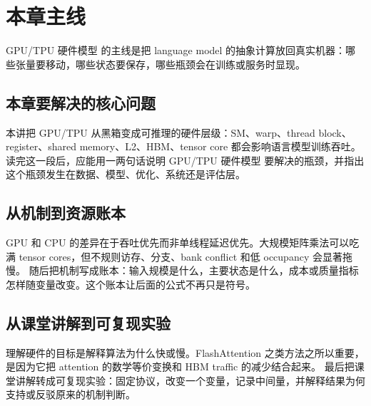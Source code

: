 \documentclass[a4paper]{article}
\begin{document}
\section{本章主线}
GPU/TPU 硬件模型 的主线是把 language model 的抽象计算放回真实机器：哪些张量要移动，哪些状态要保存，哪些瓶颈会在训练或服务时显现。
\subsection{本章要解决的核心问题}
本讲把 GPU/TPU 从黑箱变成可推理的硬件层级：SM、warp、thread block、register、shared memory、L2、HBM、tensor core 都会影响语言模型训练吞吐。
读完这一段后，应能用一两句话说明 GPU/TPU 硬件模型 要解决的瓶颈，并指出这个瓶颈发生在数据、模型、优化、系统还是评估层。
\subsection{从机制到资源账本}
GPU 和 CPU 的差异在于吞吐优先而非单线程延迟优先。大规模矩阵乘法可以吃满 tensor cores，但不规则访存、分支、bank conflict 和低 occupancy 会显著拖慢。
随后把机制写成账本：输入规模是什么，主要状态是什么，成本或质量指标怎样随变量改变。这个账本让后面的公式不再只是符号。
\subsection{从课堂讲解到可复现实验}
理解硬件的目标是解释算法为什么快或慢。FlashAttention 之类方法之所以重要，是因为它把 attention 的数学等价变换和 HBM traffic 的减少结合起来。
最后把课堂讲解转成可复现实验：固定协议，改变一个变量，记录中间量，并解释结果为何支持或反驳原来的机制判断。
\end{document}
